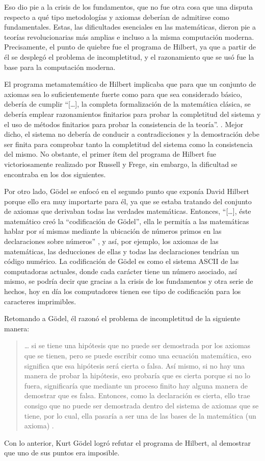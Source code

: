 \documentclass[letterpaper, 12 pt, conference]{ieeeconf}  %
\begin{document}
\begin{.}
Eso dio pie a la crisis de los fundamentos, que no fue otra cosa que una disputa respecto a qué tipo metodologías y axiomas deberían de admitirse como fundamentales. Estas, las dificultades esenciales en las matemáticas, dieron pie a teorías revolucionarias más amplias e incluso a la misma computación moderna. Precisamente, el punto de quiebre fue el programa de Hilbert, ya que a partir de él se desplegó el problema de incompletitud, y el razonamiento que se usó fue la base para la computación moderna. 
\smallskip

El programa metamatemático de Hilbert implicaba que para que un conjunto de axiomas sea lo suficientemente fuerte como para que sea considerado básico, debería de cumplir “[…], la completa formalización de la matemática clásica, se debería emplear razonamientos finitarios para probar la completitud del sistema y el uso de métodos finitarios para probar la consistencia de la teoría”. \cite{c12}. Mejor dicho, el sistema no debería de conducir a contradicciones y la demostración debe ser finita para comprobar tanto la completitud del sistema como la consistencia del mismo. No obstante, el primer ítem del programa de Hilbert fue victoriosamente realizado por Russell y Frege, sin embargo, la dificultad se encontraba en los dos siguientes. 
\smallskip

Por otro lado, Gödel se enfocó en el segundo punto que exponía David Hilbert porque ello era muy importarte para él, ya que se estaba tratando del conjunto de axiomas que derivaban todas las verdades matemáticas. Entonces, “[…], éste matemático creó la “codificación de Gödel”, ella le permitía a las matemáticas hablar por sí mismas mediante la ubicación de números primos en las declaraciones sobre números” \cite{c7}, y así, por ejemplo, los axiomas de las matemáticas, las deducciones de ellas y todas las declaraciones tendrían un código numérico. La codificación de Gödel es como el sistema ASCII de las computadoras actuales, donde cada carácter tiene un número asociado, así mismo, se podría decir que gracias a la crisis de los fundamentos y otra serie de hechos, hoy en día los computadores tienen ese tipo de codificación para los caracteres imprimibles.
\smallskip

Retomando a Gödel, él razonó el problema de incompletitud de la siguiente manera: 
\smallskip
\begin{quote}
… si se tiene una hipótesis que no puede ser demostrada por los axiomas que se tienen, pero se puede escribir como una ecuación matemática, eso significa que esa hipótesis será cierta o falsa. Así mismo, si no hay una manera de probar la hipótesis, eso probaría que es cierta porque si no lo fuera, significaría que mediante un proceso finito hay alguna manera de demostrar que es falsa. Entonces, como la declaración es cierta, ello trae consigo que no puede ser demostrada dentro del sistema de axiomas que se tiene, por lo cual, ella pasaría a ser una de las bases de la matemática (un axioma) \cite{c7}. 
\end{quote}
\smallskip
Con lo anterior, Kurt Gödel logró refutar el programa de Hilbert, al demostrar que uno de sus puntos era imposible. 
\smallskip


\end{.}
\end{document}
